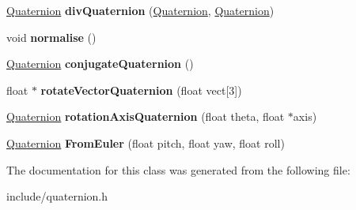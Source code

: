 \begin{DoxyCompactItemize}
\item 
\hypertarget{class_quaternion_affe88dafffc86039b97d62cd95c66ed3}{\hyperlink{class_quaternion}{Quaternion} {\bfseries div\-Quaternion} (\hyperlink{class_quaternion}{Quaternion}, \hyperlink{class_quaternion}{Quaternion})}\label{class_quaternion_affe88dafffc86039b97d62cd95c66ed3}

\item 
\hypertarget{class_quaternion_abcb5d53d3312eca0f169d625f5d56dac}{void {\bfseries normalise} ()}\label{class_quaternion_abcb5d53d3312eca0f169d625f5d56dac}

\item 
\hypertarget{class_quaternion_a8dfdb151b27d2e85f512b6bc1983c16c}{\hyperlink{class_quaternion}{Quaternion} {\bfseries conjugate\-Quaternion} ()}\label{class_quaternion_a8dfdb151b27d2e85f512b6bc1983c16c}

\item 
\hypertarget{class_quaternion_a513a2ccbc744882f26fb4c804f59147c}{float $\ast$ {\bfseries rotate\-Vector\-Quaternion} (float vect\mbox{[}3\mbox{]})}\label{class_quaternion_a513a2ccbc744882f26fb4c804f59147c}

\item 
\hypertarget{class_quaternion_a89b3763d6ef61308c6f2e92b8b8f3977}{\hyperlink{class_quaternion}{Quaternion} {\bfseries rotation\-Axis\-Quaternion} (float theta, float $\ast$axis)}\label{class_quaternion_a89b3763d6ef61308c6f2e92b8b8f3977}

\item 
\hypertarget{class_quaternion_a0d6731db0eef0f8d96ccc6fdffb8300f}{\hyperlink{class_quaternion}{Quaternion} {\bfseries From\-Euler} (float pitch, float yaw, float roll)}\label{class_quaternion_a0d6731db0eef0f8d96ccc6fdffb8300f}

\end{DoxyCompactItemize}


The documentation for this class was generated from the following file\-:\begin{DoxyCompactItemize}
\item 
include/quaternion.\-h\end{DoxyCompactItemize}
